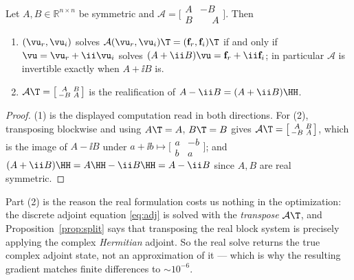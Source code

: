 \begin{proposition}
\label{prop:split}
Let $A,B\in\mathbb R^{n\times n}$ be symmetric and
$\mathcal A=\bigl[\begin{smallmatrix}A&-B\\ B&\phantom{-}A\end{smallmatrix}\bigr]$.
Then
\begin{enumerate}\itemsep0pt
\item $(\vu_r,\vu_i)$ solves $\mathcal A(\vu_r,\vu_i)\T=(\mathbf f_r,\mathbf f_i)\T$
if and only if $\vu=\vu_r+\ii\vu_i$ solves $(A+\ii B)\vu=\mathbf f_r+\ii\mathbf f_i$;
in particular $\mathcal A$ is invertible exactly when $A+\ii B$ is.
\item $\mathcal A\T=\bigl[\begin{smallmatrix}A&B\\ -B&A\end{smallmatrix}\bigr]$
is the realification of $A-\ii B=(A+\ii B)\HH$.
\end{enumerate}
\end{proposition}
\begin{proof}
(1) is the displayed computation read in both directions. For (2), transposing
blockwise and using $A\T=A$, $B\T=B$ gives
$\mathcal A\T=\bigl[\begin{smallmatrix}A&B\\ -B&A\end{smallmatrix}\bigr]$, which
is the image of $A-\ii B$ under
$a+\ii b\mapsto\bigl[\begin{smallmatrix}a&-b\\ b&a\end{smallmatrix}\bigr]$; and
$(A+\ii B)\HH=A\HH-\ii B\HH=A-\ii B$ since $A,B$ are real symmetric.
\end{proof}

Part (2) is the reason the real formulation costs us nothing in the optimization:
the discrete adjoint equation \eqref{eq:adj} is solved with the \emph{transpose}
$\mathcal A\T$, and Proposition~\ref{prop:split} says that transposing the real
block system is precisely applying the complex \emph{Hermitian} adjoint. So the
real solve returns the true complex adjoint state, not an approximation of it ---
which is why the resulting gradient matches finite differences to
$\sim\!10^{-6}$.

